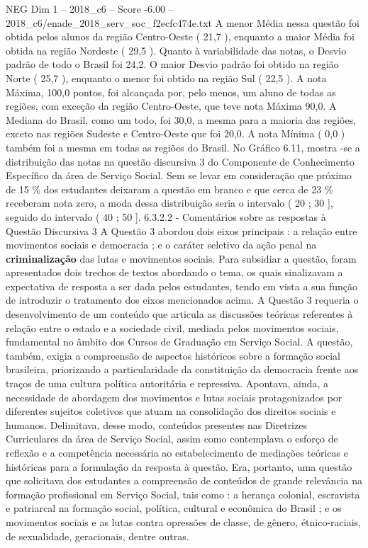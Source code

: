 \begin{textsample}{NEG Dim 1 – 2018\_c6 – Score -6.00 – 2018\_c6/enade\_2018\_serv\_soc\_f2ecfc474e.txt}
A menor Média nessa questão foi obtida pelos alunos da região Centro-Oeste ( 21,7 ), enquanto a maior Média foi obtida na região Nordeste ( 29,5 ).
Quanto à variabilidade das notas, o Desvio padrão de todo o Brasil foi 24,2.
O maior Desvio padrão foi obtido na região Norte ( 25,7 ), enquanto o menor foi obtido na região Sul ( 22,5 ).
A nota Máxima, 100,0 pontos, foi alcançada por, pelo menos, um aluno de todas as regiões, com exceção da região Centro-Oeste, que teve nota Máxima 90,0.
A Mediana do Brasil, como um todo, foi 30,0, a mesma para a maioria das regiões, exceto nas regiões Sudeste e Centro-Oeste que foi 20,0.
A nota Mínima ( 0,0 ) também foi a mesma em todas as regiões do Brasil.
No Gráfico 6.11, mostra -se a distribuição das notas na questão discursiva 3 do Componente de Conhecimento Específico da área de Serviço Social.
Sem se levar em consideração que próximo de 15 \% dos estudantes deixaram a questão em branco e que cerca de 23 \% receberam nota zero, a moda dessa distribuição seria o intervalo ( 20 ; 30 ], seguido do intervalo ( 40 ; 50 ]. 6.3.2.2 - Comentários sobre as respostas à Questão Discursiva 3 A Questão 3 abordou dois eixos principais : a relação entre movimentos sociais e democracia ; e o caráter seletivo da ação penal na \textbf{criminalização} das lutas e movimentos sociais.
Para subsidiar a questão, foram apresentados dois trechos de textos abordando o tema, os quais sinalizavam a expectativa de resposta a ser dada pelos estudantes, tendo em vista a sua função de introduzir o tratamento dos eixos mencionados acima.
A Questão 3 requeria o desenvolvimento de um conteúdo que articula as discussões teóricas referentes à relação entre o estado e a sociedade civil, mediada pelos movimentos sociais, fundamental no âmbito dos Cursos de Graduação em Serviço Social.
A questão, também, exigia a compreensão de aspectos históricos sobre a formação social brasileira, priorizando a particularidade da constituição da democracia frente aos traços de uma cultura política autoritária e repressiva.
Apontava, ainda, a necessidade de abordagem dos movimentos e lutas sociais protagonizados por diferentes sujeitos coletivos que atuam na consolidação dos direitos sociais e humanos.
Delimitava, desse modo, conteúdos presentes nas Diretrizes Curriculares da área de Serviço Social, assim como contemplava o esforço de reflexão e a competência necessária ao estabelecimento de mediações teóricas e históricas para a formulação da resposta à questão.
Era, portanto, uma questão que solicitava dos estudantes a compreensão de conteúdos de grande relevância na formação profissional em Serviço Social, tais como : a herança colonial, escravista e patriarcal na formação social, política, cultural e econômica do Brasil ; e os movimentos sociais e as lutas contra opressões de classe, de gênero, étnico-raciais, de sexualidade, geracionais, dentre outras.

\end{textsample}
